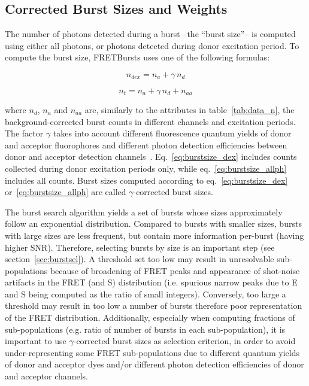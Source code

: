\documentclass[10pt,letterpaper]{article}
\begin{document}
\subsection{Corrected Burst Sizes and Weights}
\label{sec:burstsizeweights}

The number of photons detected during a burst --the ``burst size''--
is computed using either all photons, or photons detected
during donor excitation period. To compute the burst size, FRETBursts uses
one of the following formulas:

\begin{equation}
\label{eq:burstsize_dex}
n_{dex} = n_a + \gamma\,n_d
\end{equation}

\begin{equation}
\label{eq:burstsize_allph}
n_t = n_a + \gamma\,n_d + n_{aa}
\end{equation}

\noindent where $n_d$, $n_a$ and $n_{aa}$ are, similarly to the attributes
in table~\ref{tab:data_n}, the background-corrected
burst counts in different channels and excitation periods.
The factor $\gamma$ takes into account
different fluorescence quantum yields of donor and acceptor fluorophores and different
photon detection efficiencies between donor and acceptor detection
channels~\cite{Deniz_1999,Lee_2005}.
Eq.~\ref{eq:burstsize_dex} includes counts collected during donor excitation periods only,
while eq.~\ref{eq:burstsize_allph} includes all counts.
Burst sizes computed according to eq.~\ref{eq:burstsize_dex}
or~\ref{eq:burstsize_allph} are called $\gamma$-corrected burst sizes.

The burst search algorithm yields a set of bursts whose sizes
approximately follow an exponential distribution.
Compared to bursts with smaller sizes, bursts with large sizes are less frequent, 
but contain more information per-burst (having higher SNR).
Therefore, selecting bursts by size is an important step (see section~\ref{sec:burstsel}).
A threshold set too low may result in unresolvable sub-populations
because of broadening of FRET peaks and appearance of shot-noise artifacts
in the FRET (and S) distribution (i.e. spurious narrow peaks due to E and S being
computed as the ratio of small integers).
Conversely, too large a threshold may result in too low a number of bursts
therefore poor representation of the FRET distribution.
Additionally, especially when computing fractions of sub-populations
(e.g. ratio of number of bursts in each sub-population),
it is important to use $\gamma$-corrected burst sizes as selection criterion,
in order to avoid under-representing some FRET sub-populations
due to different quantum yields of donor and acceptor dyes and/or
different photon detection efficiencies of donor and acceptor channels.
\end{document}
